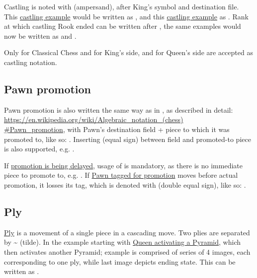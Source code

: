 Castling is noted with \alg{\&} (ampersand), after King's symbol and destination file. This
\hyperref[fig:age_of_aquarius_castling_left_04]{castling example} would be written as ,
and this \hyperref[fig:one_castling_right_04]{castling example} as . Rank at which
castling Rook ended can be written after \alg{\&}, the same examples would now be written as
 and .

Only for Classical Chess  and  for King's side,  and
 for Queen's side are accepted as castling notation.

\subsection*{Pawn promotion}
\label{sec:Appendix/Notation/Pawn promotion}

Pawn promotion is also written the same way as in , as described in detail: \\
\href{https://en.wikipedia.org/wiki/Algebraic\_notation\_(chess)\#Pawn\_promotion}{https://en.wikipedia.org/wiki/Algebraic\_notation\_(chess)\\
\#Pawn\_promotion}, with Pawn's destination field + piece to which it was promoted to,
like so: . Inserting \alg{=} (equal sign) between field and promoted-to piece
is also supported, e.g. .

If \hyperref[fig:scn_aoa_05_delayed_promo_pawn_2_moved]{promotion is being delayed}, usage of
\alg{=} is mandatory, as there is no immediate piece to promote to, e.g. .
If \hyperref[fig:scn_aoa_04_delayed_promo_pawn_2_tagged]{Pawn tagged for promotion} moves
before actual promotion, it losses its tag, which is denoted with \alg{==} (double equal
sign), like so: .

\subsection*{Ply}
\label{sec:Appendix/Notation/Ply}

\hyperref[sec:Terms/Ply]{Ply} is a movement of a single piece in a cascading move. Two plies
are separated by \~{} (tilde). In the example starting with
\hyperref[fig:scn_ma_11_cascading_init]{Queen activating a Pyramid}, which then activates another
Pyramid; example is comprised of series of 4 images, each corresponding to one ply, while last
image depicts ending state. This can be written as .

